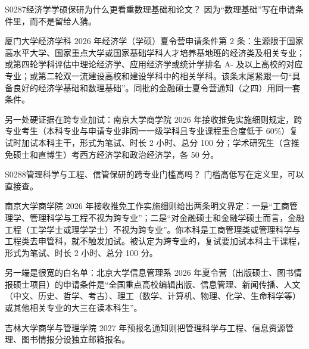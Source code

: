 \begin{qa}{S0287}{经济学学硕保研为什么更看重数理基础和论文？}
因为“数理基础”写在申请条件里，而不是留给人猜。

厦门大学经济学科 2026 年经济学（学硕）夏令营申请条件第 2 条：生源限于国家高水平大学、国家重点大学或国家基础学科人才培养基地班的经济类及相关专业；或第四轮学科评估中理论经济学、应用经济学或统计学排名 A- 及以上高校的对应专业；或第二轮双一流建设高校和建设学科中的相关学科。该条末尾紧跟一句“具备良好的经济学基础和数理基础”。同批的金融硕士夏令营通知（之四）用同一套条件。

另一处硬证据在跨专业加试：南京大学商学院 2026 年接收推免实施细则规定，跨专业考生（本科专业与申请专业非同一一级学科且专业课程重合度低于 60\%）复试时加试本科主干，形式为笔试、时长 2 小时、总分 100 分；学术研究生（含推免硕士和直博生）考西方经济学和政治经济学，各 50 分。
\end{qa}

\begin{qa}{S0288}{管理科学与工程、信管保研的跨专业门槛高吗？}
门槛高低写在定义里，可以直接查。

南京大学商学院 2026 年接收推免工作实施细则给出两条明文界定：一是“工商管理学、管理科学与工程不视为跨专业”；二是“对金融硕士和金融学硕士而言，金融工程（工学学士或理学学士）不视为跨专业”。你本科是工商管理类或管理科学与工程类去申管科，就不触发加试。被认定为跨专业的，复试要加试本科主干课程，形式为笔试、时长 2 小时、总分 100 分。

另一端是很宽的白名单：北京大学信息管理系 2026 年夏令营（出版硕士、图书情报硕士项目）的申请条件是“全国重点高校编辑出版、信息管理、新闻传播、人文（中文、历史、哲学、考古）、理工（数学、计算机、物理、化学、生命科学等）或其他相关专业的大三在读本科生”。

吉林大学商学与管理学院 2027 年预报名通知则把管理科学与工程、信息资源管理、图书情报分设独立邮箱报名。
\end{qa}

